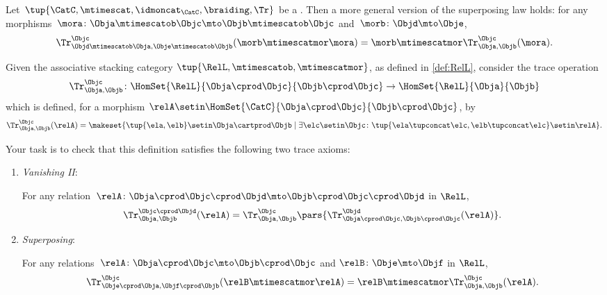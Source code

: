 \begin{lemma}
    \label{lem:general-superposing-law}
    Let~$\tup{\CatC, \mtimescat,\idmoncat_{\CatC}, \braiding, \Tr}$ be a .
    Then a more general version of the superposing law holds: for any morphisms~$\mora\colon \Obja\mtimescatob \Objc \mto \Objb \mtimescatob \Objc$ and~$\morb \colon \Objd \mto \Obje$,
    \begin{equation}
        \label{eq:superposing_2}
        \Tr_{\Objd\mtimescatob \Obja,\Obje\mtimescatob \Objb}^{\Objc}(\morb \mtimescatmor \mora)=\morb \mtimescatmor \Tr_{\Obja,\Objb}^\Objc(\mora).
    \end{equation}
\end{lemma}
\missingproof


\begin{gradedexercise}
    \label{eq:TracingRelations}

    Given the associative stacking category $\tup{\RelL, \mtimescatob, \mtimescatmor}$, as defined in \cref{def:RelL}, consider the trace operation
    $$\Tr_{\Obja,\Objb}^\Objc \colon \HomSet{\RelL}{\Obja \cprod \Objc}{\Objb \cprod \Objc}\to \HomSet{\RelL}{\Obja}{\Objb}$$
    which is defined, for a morphism $\relA \setin\HomSet{\CatC}{\Obja \cprod \Objc}{\Objb\cprod \Objc}$, by
    \begin{equation}
        \Tr_{\Obja,\Objb}^\Objc(\relA) = \makeset{\tup{\ela, \elb} \setin\Obja \cartprod \Objb \mid \exists \elc \setin\Objc \colon \tup{\ela \tupconcat \elc, \elb \tupconcat \elc} \setin\relA}.
    \end{equation}

    Your task is to check that this definition satisfies the following two trace axioms:

    \begin{enumerate}

        \item \emph{Vanishing II}:

              For any relation~$\relA \colon \Obja \cprod \Objc \cprod \Objd \mto \Objb\cprod \Objc \cprod \Objd$ in $\RelL$,
              \begin{equation}
                  \Tr_{\Obja,\Objb}^{\Objc\cprod \Objd}(\relA) = \Tr_{\Obja,\Objb}^\Objc\pars{
                      \Tr_{\Obja \cprod \Objc, \Objb \cprod \Objc}^\Objd(\relA)}.
              \end{equation}

        \item \emph{Superposing}:

              For any relations~$\relA \colon \Obja\cprod \Objc \mto \Objb\cprod \Objc$ and $\relB \colon \Obje \mto \Objf$ in $\RelL$,
              \begin{equation}
                  \Tr_{\Obje\cprod \Obja,\Objf\cprod \Objb}^{\Objc}(\relB \mtimescatmor \relA) = \relB \mtimescatmor \Tr_{\Obja,\Objb}^\Objc(\relA).
              \end{equation}
    \end{enumerate}
\end{gradedexercise}

